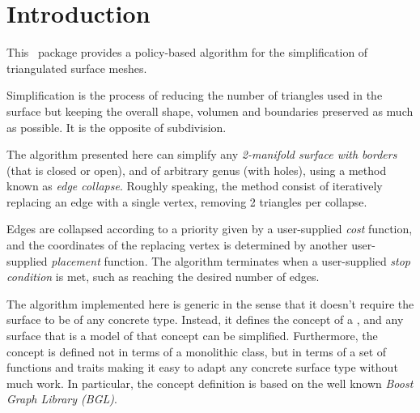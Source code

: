 
\section{Introduction}

This \cgal\ package provides a policy-based algorithm for the simplification of triangulated surface meshes.

Simplification is the process of reducing the number of triangles used in the surface but keeping the overall shape, volumen and boundaries preserved as much as possible. It is the opposite of subdivision.


The algorithm presented here can simplify any {\em 2-manifold surface with borders} (that is closed or open), and of arbitrary genus (with holes), using a method known as {\em edge collapse}. Roughly speaking, the method consist of iteratively replacing an edge with a single vertex, removing 2 triangles per collapse.


Edges are collapsed according to a priority given by a user-supplied {\em cost} function, and the coordinates of the replacing vertex is determined by another user-supplied {\em placement} function. The algorithm terminates when a user-supplied {\em stop condition} is met, such as reaching the desired number of edges.

The algorithm implemented here is generic in the sense that it doesn't require the surface to be of any concrete type. Instead, it defines the concept of a , and any surface that is a model of that concept can be simplified. Furthermore, the concept is defined not in terms of a monolithic class, but in terms of a set of functions and traits making it easy to adapt any concrete surface type without much work. In particular, the concept definition is based on the well known {\em Boost Graph Library (BGL)}.

